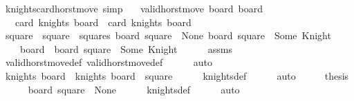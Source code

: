 \begin{isabellebody}
\endisatagproof
{\isafoldproof}%
%
\isadelimproof
\isanewline
%
\endisadelimproof
\isanewline
{}\isamarkupfalse%
\ knights{\isacharunderscore}card{\isacharunderscore}horst{\isacharunderscore}move\ {\isacharbrackleft}simp{\isacharbrackright}{\isacharcolon}\isanewline
\ \ \ {\isachardoublequoteopen}valid{\isacharunderscore}horst{\isacharunderscore}move\ board\ board{\isacharprime}{\isachardoublequoteclose}\isanewline
\ \ \ {\isachardoublequoteopen}card\ {\isacharparenleft}knights\ board{\isacharprime}{\isacharparenright}\ {\isacharequal}\ card\ {\isacharparenleft}knights\ board{\isacharparenright}\ {\isacharplus}\ {}{\isachardoublequoteclose}\isanewline
%
\isadelimproof
%
\endisadelimproof
%
\isatagproof
{}\isamarkupfalse%
{\isacharminus}\isanewline
\ \ \isamarkupfalse%
\ square\ \ {\isachardoublequoteopen}square\ {\isasymin}\ squares{\isachardoublequoteclose}\ {\isachardoublequoteopen}board\ square\ {\isacharequal}\ None{\isachardoublequoteclose}\ {\isachardoublequoteopen}board{\isacharprime}\ square\ {\isacharequal}\ Some\ Knight{\isachardoublequoteclose}\isanewline
\ \ \ \ {\isachardoublequoteopen}board{\isacharprime}\ {\isacharequal}\ board\ {\isacharparenleft}square\ {\isacharcolon}{\isacharequal}\ Some\ Knight{\isacharparenright}{\isachardoublequoteclose}\isanewline
\ \ \ \ \isamarkupfalse%
\ assms\isanewline
\ \ \ \ \isamarkupfalse%
\ valid{\isacharunderscore}horst{\isacharunderscore}move{\isacharunderscore}def\ valid{\isacharunderscore}horst{\isacharunderscore}move{\isacharprime}{\isacharunderscore}def\isanewline
\ \ \ \ \isamarkupfalse%
\ auto\isanewline
\ \ \isamarkupfalse%
\ \isamarkupfalse%
\ {\isachardoublequoteopen}knights\ board{\isacharprime}\ {\isacharequal}\ knights\ board\ {\isasymunion}\ {\isacharbraceleft}square{\isacharbraceright}{\isachardoublequoteclose}\isanewline
\ \ \ \ \isamarkupfalse%
\ knights{\isacharunderscore}def\isanewline
\ \ \ \ \isamarkupfalse%
\ auto\isanewline
\ \ \isamarkupfalse%
\ \isamarkupfalse%
\ {\isacharquery}thesis\isanewline
\ \ \ \ \isamarkupfalse%
\ {\isacharbackquoteopen}board\ square\ {\isacharequal}\ None{\isacharbackquoteclose}\isanewline
\ \ \ \ \isamarkupfalse%
\ knights{\isacharunderscore}def\isanewline
\ \ \ \ \isamarkupfalse%
\ auto\isanewline
{}\isamarkupfalse%

\end{isabellebody}
